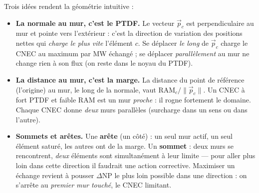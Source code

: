 \documentclass[11pt,a4paper]{article}
\begin{document}
Trois idées rendent la géométrie intuitive :
\begin{itemize}[leftmargin=1.4em]
  \item \textbf{La normale au mur, c'est le PTDF.} Le vecteur $\vec p_c$ est
        perpendiculaire au mur et pointe vers l'extérieur : c'est la
        direction de variation des positions nettes qui \emph{charge le plus
        vite} l'élément $c$. Se déplacer \emph{le long} de $\vec p_c$ charge
        le CNEC au maximum par MW échangé ; se déplacer \emph{parallèlement}
        au mur ne change rien à son flux (on reste dans le noyau du PTDF).
  \item \textbf{La distance au mur, c'est la marge.} La distance du point de
        référence (l'origine) au mur, le long de la normale, vaut
        $\mathrm{RAM}_c/\lVert\vec p_c\rVert$. Un CNEC à fort PTDF et faible
        RAM est un mur \emph{proche} : il rogne fortement le domaine. Chaque
        CNEC donne \emph{deux} murs parallèles (surcharge dans un sens ou
        dans l'autre).
  \item \textbf{Sommets et arêtes.} Une \textbf{arête} (un côté) : un seul
        mur actif, un seul élément saturé, les autres ont de la marge. Un
        \textbf{sommet} : deux murs se rencontrent, \emph{deux} éléments sont
        simultanément à leur limite — pour aller plus loin dans cette
        direction il faudrait une action corrective. Maximiser un échange
        revient à pousser $\Delta\mathrm{NP}$ le plus loin possible dans une
        direction : on s'arrête au \emph{premier mur touché}, le CNEC
        limitant.
\end{itemize}

\begin{center}
\end{center}
\end{document}
